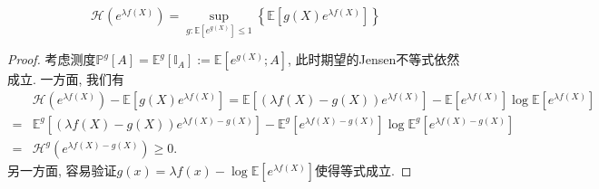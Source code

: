 \begin{theorem}[熵的变分表示]\label{thm:VariationalRepresentationForEntropy}
	\begin{equation}\label{eq:VariationalRepresentationForEntropy}
		\mathcal{H}(e^{\lambda f(X)})
		= \sup_{g \colon \mathbb{E}[e^{g(X)}] \leq 1} \left\{ \mathbb{E} \left[g(X) e^{\lambda f(X)} \right] \right\}
	\end{equation}
\end{theorem}
\begin{proof}
	考虑测度$\mathbb{P}^g[A] = \mathbb{E}^g [\mathbb{I}_A] := \mathbb{E}[e^{g(X)}; A]$, 此时期望的Jensen不等式依然成立. 
	一方面, 我们有
	\begin{align*}
		&\mathcal{H}(e^{\lambda f(X)}) - \mathbb{E}[g(X) e^{\lambda f(X)}]
		= \mathbb{E}\left[ (\lambda f(X) - g(X)) e^{\lambda f(X)} \right] - \mathbb{E}[ e^{\lambda f(X)}] \log \mathbb{E}[ e^{\lambda f(X)}] \\
		=& \mathbb{E}^g  \left[ (\lambda f(X) - g(X)) e^{\lambda f(X) - g(X)} \right] - \mathbb{E}^g[ e^{\lambda f(X) - g(X)}] \log \mathbb{E}^g[ e^{\lambda f(X) - g(X)}] \\
		=& \mathcal{H}^g(e^{\lambda f(X) - g(X)}) \geq 0. 
	\end{align*}
	另一方面, 容易验证$g(x) = \lambda f(x) - \log \mathbb{E}[e^{\lambda f(X)}]$使得等式成立. 
\end{proof}

